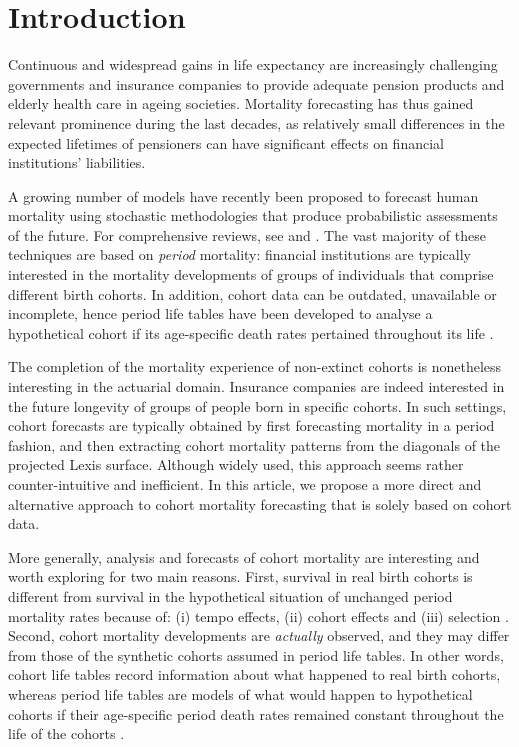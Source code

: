 \documentclass[11pt, a4paper]{article}
\begin{document}
\section{Introduction}
\label{Sec:Intro}

\linenumbers
	
Continuous and widespread gains in life expectancy \citep{riley2001rising,oeppen2002broken} are increasingly challenging governments and insurance companies to provide adequate pension products and elderly health care in ageing societies. Mortality forecasting has thus gained relevant prominence during the last decades, as relatively small differences in the expected lifetimes of pensioners can have significant effects on financial institutions' liabilities.

A growing number of models have recently been proposed to forecast human mortality using stochastic methodologies that produce probabilistic assessments of the future. For comprehensive reviews, see \cite{booth2006demographic} and \cite{shang2011point}. The vast majority of these techniques are based on \textit{period} mortality: financial institutions are typically interested in the mortality developments of groups of individuals that comprise different birth cohorts. In addition, cohort data can be outdated, unavailable or incomplete, hence period life tables have been developed to analyse a hypothetical cohort if its age-specific death rates pertained throughout its life \citep{preston2001demogr}.
 
The completion of the mortality experience of non-extinct cohorts is nonetheless interesting in the actuarial domain. Insurance companies are indeed interested in the future longevity of groups of people born in specific cohorts. In such settings, cohort forecasts are typically obtained by first forecasting mortality in a period fashion, and then extracting cohort mortality patterns from the diagonals of the projected Lexis surface. Although widely used, this approach seems rather counter-intuitive and inefficient. In this article, we propose a more direct and alternative approach to cohort mortality forecasting that is solely based on cohort data.

More generally, analysis and forecasts of cohort mortality are interesting and worth exploring for two main reasons. First, survival in real birth cohorts is different from survival in the hypothetical situation of unchanged period mortality rates because of: (i) tempo effects, (ii) cohort effects and (iii) selection \cite[for a full discussion, see][pp.~90--92]{borgan2019cohort}. Second, cohort mortality developments are \textit{actually} observed, and they may differ from those of the synthetic cohorts assumed in period life tables. {\color{red}In other words, cohort life tables record information about what happened to real birth cohorts, whereas period life tables are models of what would happen to hypothetical cohorts if their age-specific period death rates remained constant throughout the life of the cohorts \citep{preston2001demogr}.}
\end{document}
